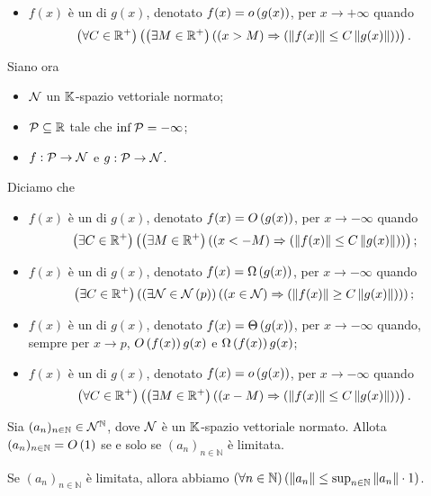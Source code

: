 \begin{Definition}
\begin{itemize}
		\item $f(x)$ \`e un  di $g(x)$, denotato $f(x) = o \left ( g(x) \right )$, per $x \rightarrow + \infty$ quando $$\ForAll{C \in \RealPositive}{\Exists{M \in \RealPositive}{\Implies{x > M}{\Norm{f(x)} \leq C \Norm{g(x)}}}}.$$
	\end{itemize}
	\par Siano ora
	\begin{itemize}
		\item $\mathcal{N}$ un $\mathbb{K}$-spazio vettoriale normato;
		\item $\mathcal{P} \subseteq \mathbb{R}$ tale che $\inf{\mathcal{P}} = - \infty$;
		\item $f: \mathcal{P} \rightarrow \mathcal{N}$ e $g: \mathcal{P} \rightarrow \mathcal{N}$.
	\end{itemize}
	Diciamo che
	\begin{itemize}
		\item $f(x)$ \`e un  di $g(x)$, denotato $f(x) = O \left ( g(x) \right )$, per $x \rightarrow - \infty$ quando $$\Exists{C \in \RealPositive}{\Exists{M \in \RealPositive}{\Implies{x < - M}{\Norm{f(x)} \leq C \Norm{g(x)}}}};$$
		\item $f(x)$ \`e un  di $g(x)$, denotato $f(x) = \Omega \left ( g(x) \right )$, per $x \rightarrow - \infty$ quando $$\Exists{C \in \RealPositive}{\Exists{\Neighborhood \in \Neighborhoods{\AccumulationPoint}}{\Implies{x \in \Neighborhood}{\Norm{f(x)} \geq C \Norm{g(x)}}}};$$
		\item $f(x)$ \`e un  di $g(x)$, denotato $f(x) = \Theta \left ( g(x) \right )$, per $x \rightarrow - \infty$ quando, sempre per $x \rightarrow p$, $O \left ( f(x) \right ){g(x)}$ e $\Omega \left ( f(x) \right ){g(x)}$;
		\item $f(x)$ \`e un  di $g(x)$, denotato $f(x) = o \left ( g(x) \right )$, per $x \rightarrow - \infty$ quando $$\ForAll{C \in \RealPositive}{\Exists{M \in \RealPositive}{\Implies{x - M}{\Norm{f(x)} \leq C \Norm{g(x)}}}}.$$
	\end{itemize}
\end{Definition}
\begin{Theorem}
	Sia $(a_n)_{n \in \mathbb{N}} \in \mathbb{\mathcal{N}}^\mathbb{N}$, dove $\mathcal{N}$ \`e un $\mathbb{K}$-spazio vettoriale normato. Allota $(a_n)_{n \in \mathbb{N}} = O \left ( 1 \right )$ se e solo se $(a_n)_{n \in \mathbb{N}}$ \`e limitata.
\end{Theorem}
\Proof Se $(a_n)_{n \in \mathbb{N}}$ \`e limitata, allora abbiamo $\ForAll{n \in \mathbb{N}}{\Norm{a_n} \leq \sup_{n \in \mathbb{N}} \Norm{a_n} \cdot 1}$.
